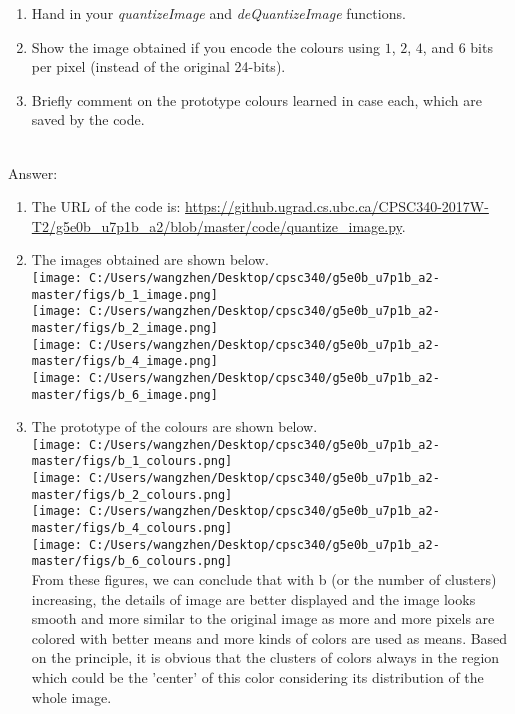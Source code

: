 \documentclass{article}
\def\blu#1{{\color{blu}#1}}
\def\enum#1{\begin{enumerate}#1\end{enumerate}}
\begin{document}
\blu{\enum{
\item Hand in your \emph{quantizeImage} and \emph{deQuantizeImage} functions.
\item Show the image obtained if you encode the colours using $1$, $2$, $4$, and $6$ bits per pixel (instead of the original 24-bits).
\item Briefly comment on the prototype colours learned in case each, which are saved by the code.
}}
\textcolor{gre}{\\Answer:
\enum{
\item The URL of the code is: \url{https://github.ugrad.cs.ubc.ca/CPSC340-2017W-T2/g5e0b_u7p1b_a2/blob/master/code/quantize_image.py}.
\item The images obtained are shown below.\\
   \texttt{[image: C:/Users/wangzhen/Desktop/cpsc340/g5e0b\_u7p1b\_a2-master/figs/b\_1\_image.png]}\\
\texttt{[image: C:/Users/wangzhen/Desktop/cpsc340/g5e0b\_u7p1b\_a2-master/figs/b\_2\_image.png]}\\
    \texttt{[image: C:/Users/wangzhen/Desktop/cpsc340/g5e0b\_u7p1b\_a2-master/figs/b\_4\_image.png]}\\
    \texttt{[image: C:/Users/wangzhen/Desktop/cpsc340/g5e0b\_u7p1b\_a2-master/figs/b\_6\_image.png]}\\
\item The prototype of the colours are shown below.\\ \texttt{[image: C:/Users/wangzhen/Desktop/cpsc340/g5e0b\_u7p1b\_a2-master/figs/b\_1\_colours.png]}\\
    \texttt{[image: C:/Users/wangzhen/Desktop/cpsc340/g5e0b\_u7p1b\_a2-master/figs/b\_2\_colours.png]}\\
    \texttt{[image: C:/Users/wangzhen/Desktop/cpsc340/g5e0b\_u7p1b\_a2-master/figs/b\_4\_colours.png]}\\
    \texttt{[image: C:/Users/wangzhen/Desktop/cpsc340/g5e0b\_u7p1b\_a2-master/figs/b\_6\_colours.png]}\\
    From these figures, we can conclude that with b (or the number of clusters) increasing, the details of image are better displayed and the image looks smooth and more similar to the original image as more and more pixels are colored with better means and more kinds of colors are used as means. Based on the principle, it is obvious that the clusters of colors always in the region which could be the 'center' of this color considering its distribution of the whole image.
}}
\end{document}

